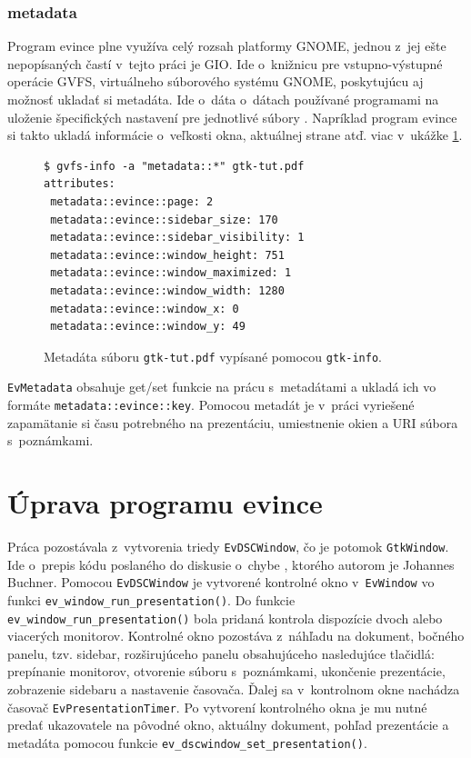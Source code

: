 \documentclass[12pt,oneside,final]{fithesis2}
\begin{document}
\subsection{metadata}
Program evince plne využíva celý rozsah platformy GNOME, jednou z~jej ešte nepopísaných častí v~tejto práci je GIO. Ide o~knižnicu pre vstupno-výstupné operácie GVFS, virtuálneho súborového systému GNOME, poskytujúcu aj možnosť ukladať si metadáta. Ide o~dáta o~dátach používané programami na uloženie špecifických nastavení pre jednotlivé súbory \cite{metad}. Napríklad program evince si takto ukladá informácie o~veľkosti okna, aktuálnej strane atď. viac v~ukážke \ref{meta}.
\begin{figure}[hbpt]
\begin{tiny}
\begin{verbatim}
$ gvfs-info -a "metadata::*" gtk-tut.pdf 
attributes:
 metadata::evince::page: 2
 metadata::evince::sidebar_size: 170
 metadata::evince::sidebar_visibility: 1
 metadata::evince::window_height: 751
 metadata::evince::window_maximized: 1
 metadata::evince::window_width: 1280
 metadata::evince::window_x: 0
 metadata::evince::window_y: 49
\end{verbatim}
\end{tiny}
\caption{Metadáta súboru \texttt{gtk-tut.pdf} vypísané pomocou \texttt{gtk-info}.}
\label{meta}
\end{figure}

\texttt{EvMetadata} obsahuje get/set funkcie na prácu s~metadátami a ukladá ich vo formáte \texttt{metadata::evince::key}. Pomocou metadát je v~práci vyriešené zapamätanie si času potrebného na prezentáciu, umiestnenie okien a URI súbora s~poznámkami.

\chapter{Úprava programu evince}
Práca pozostávala z~vytvorenia triedy \texttt{EvDSCWindow}, čo je potomok \texttt{GtkWindow}. Ide o~prepis kódu poslaného do diskusie o~chybe \cite{evbug}, ktorého autorom je Johannes Buchner. Pomocou \texttt{EvDSCWindow} je vytvorené kontrolné okno v~\texttt{EvWindow} vo funkci \texttt{ev\_\-window\_\-run\_\-presentation()}. Do funkcie \texttt{ev\_\-window\_\-run\_\-presentation()} bola pridaná kontrola dispozície dvoch alebo viacerých monitorov. Kontrolné okno pozostáva z~náhľadu na dokument, bočného panelu, tzv. sidebar, rozširujúceho panelu obsahujúceho nasledujúce tlačidlá: prepínanie monitorov, otvorenie súboru s~poznámkami, ukončenie prezentácie, zobrazenie sidebaru a nastavenie časovača. Ďalej sa v~kontrolnom okne nachádza časovač \texttt{EvPresentationTimer}. Po vytvorení kontrolného okna je mu nutné predať ukazovatele na pôvodné okno, aktuálny dokument, pohľad prezentácie a metadáta pomocou funkcie \texttt{ev\_\-dscwindow\_\-set\_\-presentation()}.
\end{document}
